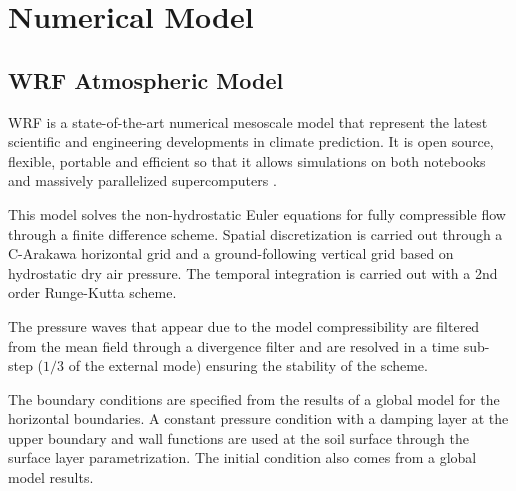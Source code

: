 \section{Numerical Model}
\subsection{WRF Atmospheric Model}
WRF is a state-of-the-art numerical mesoscale model that represent the latest scientific and engineering developments in climate prediction. It is open source, flexible, portable and efficient so that it allows simulations on both notebooks and massively parallelized supercomputers \citep{https://doi.org/10.5065/d68s4mvh}.

This model solves the non-hydrostatic Euler equations for fully compressible flow through a finite difference scheme. Spatial discretization is carried out through a C-Arakawa horizontal grid and a ground-following vertical grid based on hydrostatic dry air pressure. The temporal integration is carried out with a 2nd order Runge-Kutta scheme.

The pressure waves that appear due to the model compressibility are filtered from the mean field through a divergence filter and are resolved in a time sub-step ($1/3$ of the external mode) ensuring the stability of the scheme.

The boundary conditions are specified from the results of a global model for the horizontal boundaries.  A constant pressure condition with a damping layer at the upper boundary and wall functions are used at the soil surface through the surface layer parametrization. The initial condition also comes from a global model results.

